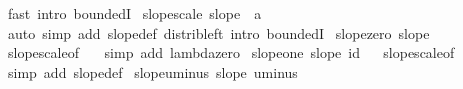\begin{isabellebody}
\ {\isacharparenleft}{\kern0pt}fast\ intro{\isacharcolon}{\kern0pt}\ boundedI{\isacharparenright}{\kern0pt}\isanewline
{}\isamarkupfalse%
%
\endisatagproof
{\isafoldproof}%
%
\isadelimproof
\isanewline
%
\endisadelimproof
\isanewline
{}\isamarkupfalse%
\ slope{\isacharunderscore}{\kern0pt}scale{\isacharcolon}{\kern0pt}\ {\isachardoublequoteopen}slope\ {\isacharparenleft}{\kern0pt}{\isacharparenleft}{\kern0pt}{\isacharasterisk}{\kern0pt}{\isacharparenright}{\kern0pt}\ a{\isacharparenright}{\kern0pt}{\isachardoublequoteclose}%
\isadelimproof
\ %
\endisadelimproof
%
\isatagproof
{}\isamarkupfalse%
\ {\isacharparenleft}{\kern0pt}auto\ simp\ add{\isacharcolon}{\kern0pt}\ slope{\isacharunderscore}{\kern0pt}def\ distrib{\isacharunderscore}{\kern0pt}left\ intro{\isacharcolon}{\kern0pt}\ boundedI{\isacharparenright}{\kern0pt}%
\endisatagproof
{\isafoldproof}%
%
\isadelimproof
%
\endisadelimproof
\isanewline
\isanewline
{}\isamarkupfalse%
\ slope{\isacharunderscore}{\kern0pt}zero{\isacharcolon}{\kern0pt}\ {\isachardoublequoteopen}slope\ {\isacharparenleft}{\kern0pt}{\isasymlambda}{\isacharunderscore}{\kern0pt}{\isachardot}{\kern0pt}\ {}{\isacharparenright}{\kern0pt}{\isachardoublequoteclose}%
\isadelimproof
\ %
\endisadelimproof
%
\isatagproof
{}\isamarkupfalse%
\ slope{\isacharunderscore}{\kern0pt}scale{\isacharbrackleft}{\kern0pt}of\ {}{\isacharbrackright}{\kern0pt}\ \isamarkupfalse%
\ {\isacharparenleft}{\kern0pt}simp\ add{\isacharcolon}{\kern0pt}\ lambda{\isacharunderscore}{\kern0pt}zero{\isacharparenright}{\kern0pt}%
\endisatagproof
{\isafoldproof}%
%
\isadelimproof
%
\endisadelimproof
\isanewline
\isanewline
{}\isamarkupfalse%
\ slope{\isacharunderscore}{\kern0pt}one{\isacharcolon}{\kern0pt}\ {\isachardoublequoteopen}slope\ id{\isachardoublequoteclose}%
\isadelimproof
\ %
\endisadelimproof
%
\isatagproof
{}\isamarkupfalse%
\ slope{\isacharunderscore}{\kern0pt}scale{\isacharbrackleft}{\kern0pt}of\ {}{\isacharbrackright}{\kern0pt}\ \isamarkupfalse%
\ {\isacharparenleft}{\kern0pt}simp\ add{\isacharcolon}{\kern0pt}\ slope{\isacharunderscore}{\kern0pt}def{\isacharparenright}{\kern0pt}%
\endisatagproof
{\isafoldproof}%
%
\isadelimproof
%
\endisadelimproof
\isanewline
\isanewline
{}\isamarkupfalse%
\ slope{\isacharunderscore}{\kern0pt}uminus{\isacharcolon}{\kern0pt}\ {\isachardoublequoteopen}slope\ uminus{\isachardoublequoteclose}%
\isadelimproof
\ %
\endisadelimproof
%
\isatagproof

\end{isabellebody}

